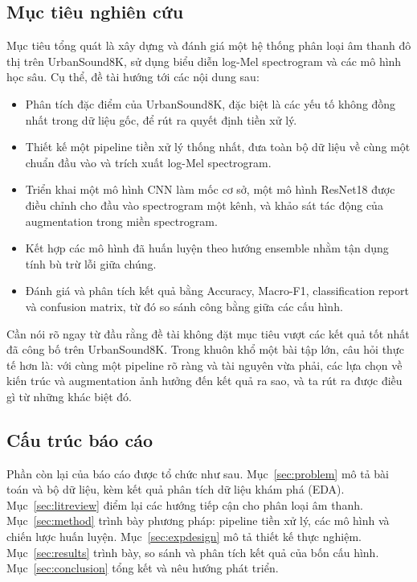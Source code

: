 \subsection{Mục tiêu nghiên cứu}

Mục tiêu tổng quát là xây dựng và đánh giá một hệ thống phân loại âm thanh đô thị
trên UrbanSound8K, sử dụng biểu diễn log-Mel spectrogram và các mô hình học sâu.
Cụ thể, đề tài hướng tới các nội dung sau:

\begin{itemize}[leftmargin=1.4em,itemsep=2pt]
  \item Phân tích đặc điểm của UrbanSound8K, đặc biệt là các yếu tố không đồng
        nhất trong dữ liệu gốc, để rút ra quyết định tiền xử lý.
  \item Thiết kế một pipeline tiền xử lý thống nhất, đưa toàn bộ dữ liệu về cùng
        một chuẩn đầu vào và trích xuất log-Mel spectrogram.
  \item Triển khai một mô hình CNN làm mốc cơ sở, một mô hình ResNet18 được điều
        chỉnh cho đầu vào spectrogram một kênh, và khảo sát tác động của
        augmentation trong miền spectrogram.
  \item Kết hợp các mô hình đã huấn luyện theo hướng ensemble nhằm tận dụng tính
        bù trừ lỗi giữa chúng.
  \item Đánh giá và phân tích kết quả bằng Accuracy, Macro-F1, classification
        report và confusion matrix, từ đó so sánh công bằng giữa các cấu hình.
\end{itemize}

Cần nói rõ ngay từ đầu rằng đề tài không đặt mục tiêu vượt các kết quả tốt nhất
đã công bố trên UrbanSound8K. Trong khuôn khổ một bài tập lớn, câu hỏi thực tế
hơn là: với cùng một pipeline rõ ràng và tài nguyên vừa phải, các lựa chọn về
kiến trúc và augmentation ảnh hưởng đến kết quả ra sao, và ta rút ra được điều gì
từ những khác biệt đó.

\subsection{Cấu trúc báo cáo}

Phần còn lại của báo cáo được tổ chức như sau. Mục~\ref{sec:problem} mô tả bài
toán và bộ dữ liệu, kèm kết quả phân tích dữ liệu khám phá (EDA).
Mục~\ref{sec:litreview} điểm lại các hướng tiếp cận cho phân loại âm thanh.
Mục~\ref{sec:method} trình bày phương pháp: pipeline tiền xử lý, các mô hình và
chiến lược huấn luyện. Mục~\ref{sec:expdesign} mô tả thiết kế thực nghiệm.
Mục~\ref{sec:results} trình bày, so sánh và phân tích kết quả của bốn cấu hình.
Mục~\ref{sec:conclusion} tổng kết và nêu hướng phát triển.
